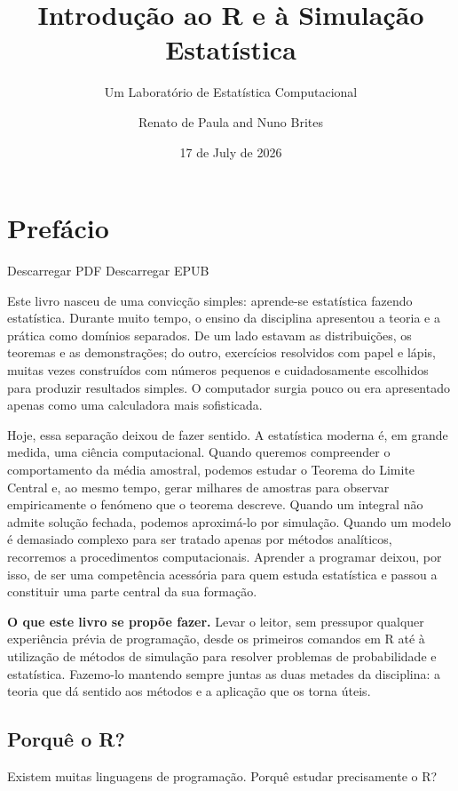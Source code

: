 \documentclass[
  portuguese,
  11pt,
  openany]{book}
\title{Introdução ao R e à Simulação Estatística}
\subtitle{Um Laboratório de Estatística Computacional}
\author{Renato de Paula and Nuno Brites}
\date{17 de July de 2026}
\begin{document}
\maketitle

{
\setcounter{tocdepth}{1}
\tableofcontents
}
\chapter*{Prefácio}\label{prefuxe1cio}


Descarregar PDF
Descarregar EPUB

Este livro nasceu de uma convicção simples: aprende-se estatística fazendo estatística. Durante muito tempo, o ensino da disciplina apresentou a teoria e a prática como domínios separados. De um lado estavam as distribuições, os teoremas e as demonstrações; do outro, exercícios resolvidos com papel e lápis, muitas vezes construídos com números pequenos e cuidadosamente escolhidos para produzir resultados simples. O computador surgia pouco ou era apresentado apenas como uma calculadora mais sofisticada.

Hoje, essa separação deixou de fazer sentido. A estatística moderna é, em grande medida, uma ciência computacional. Quando queremos compreender o comportamento da média amostral, podemos estudar o Teorema do Limite Central e, ao mesmo tempo, gerar milhares de amostras para observar empiricamente o fenómeno que o teorema descreve. Quando um integral não admite solução fechada, podemos aproximá-lo por simulação. Quando um modelo é demasiado complexo para ser tratado apenas por métodos analíticos, recorremos a procedimentos computacionais. Aprender a programar deixou, por isso, de ser uma competência acessória para quem estuda estatística e passou a constituir uma parte central da sua formação.

\textbf{O que este livro se propõe fazer.} Levar o leitor, sem pressupor qualquer
experiência prévia de programação, desde os primeiros comandos em R até à
utilização de métodos de simulação para resolver problemas de probabilidade e
estatística. Fazemo-lo mantendo sempre juntas as duas metades da disciplina: a teoria que dá sentido aos métodos e a aplicação que os torna úteis.

\section{Porquê o R?}\label{porquuxea-o-r}

Existem muitas linguagens de programação. Porquê estudar precisamente o R?
\end{document}
